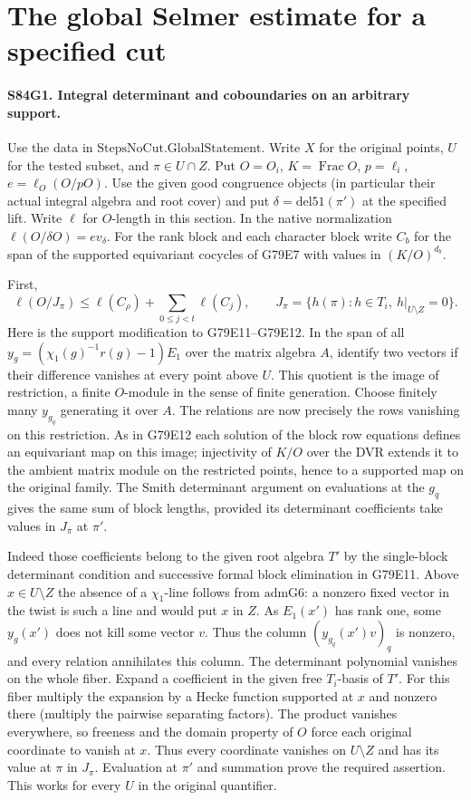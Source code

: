 \section{The global Selmer estimate for a specified cut}

\paragraph{S84G1. Integral determinant and coboundaries on an arbitrary support.}
Use the data in $\mathrm{StepsNoCut}.\mathrm{GlobalStatement}$.
Write $X$ for the original points, $U$ for the tested subset,
and $\pi\in U\cap Z$. Put $O=O_i$, $K=\operatorname{Frac}O$,
$p=\ell_i$, $e=\ell_O(O/pO)$. Use the given good congruence
objects (in particular their actual integral algebra and
root cover) and put $\delta=\mathrm{del51}(\pi')$ at the
specified lift. Write $\ell$ for $O$-length in this section.
In the native normalization $\ell(O/\delta O)=e v_\delta$.
For the rank block and each character block write $C_b$
for the span of the supported equivariant cocycles of G79E7
with values in $(K/O)^{d_b}$.

First,
\[
   \ell(O/J_\pi)\le \ell(C_\rho)+\sum_{0\le j<t}\ell(C_j),
   \qquad J_\pi=\{h(\pi):h\in T_i,\ h|_{U\setminus Z}=0\}.
\]
Here is the support modification to G79E11--G79E12.
In the span of all $y_g=(\chi_1(g)^{-1}r(g)-1)E_1$ over
the matrix algebra $A$, identify two vectors if their
difference vanishes at every point above $U$. This quotient
is the image of restriction, a finite $O$-module in the
sense of finite generation. Choose finitely many $y_{g_q}$
generating it over $A$. The relations are now precisely the
rows vanishing on this restriction. As in G79E12 each solution
of the block row equations defines an equivariant map on
this image; injectivity of $K/O$ over the DVR extends it to
the ambient matrix module on the restricted points, hence
to a supported map on the original family. The Smith determinant
argument on evaluations at the $g_q$ gives the same sum of
block lengths, provided its determinant coefficients take
values in $J_\pi$ at $\pi'$.

Indeed those coefficients belong to the given root algebra
$T'$ by the single-block determinant condition and successive
formal block elimination in G79E11. Above $x\in U\setminus Z$
the absence of a $\chi_1$-line follows from $\mathrm{admG6}$:
a nonzero fixed vector in the twist is such a line and would
put $x$ in $Z$. As $E_1(x')$ has rank one, some $y_g(x')$
does not kill some vector $v$. Thus the column
$(y_{g_q}(x')v)_q$ is nonzero, and every relation annihilates
this column. The determinant polynomial vanishes on the
whole fiber. Expand a coefficient in the given free $T_i$-basis
of $T'$. For this fiber multiply the expansion by a Hecke
function supported at $x$ and nonzero there (multiply the
pairwise separating factors). The product vanishes everywhere,
so freeness and the domain property of $O$ force each original
coordinate to vanish at $x$. Thus every coordinate vanishes
on $U\setminus Z$ and has its value at $\pi$ in $J_\pi$.
Evaluation at $\pi'$ and summation prove the required assertion.
This works for every $U$ in the original quantifier.

